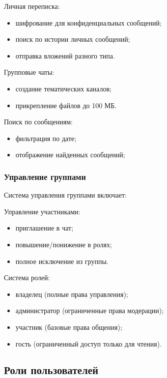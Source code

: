 Личная переписка:

	\begin{itemize}
		\item шифрование для конфиденциальных сообщений;
		\item поиск по истории личных сообщений;
		\item отправка вложений разного типа.
	\end{itemize}
	
Групповые чаты:

	\begin{itemize}
		\item создание тематических каналов;
		\item прикрепление файлов до 100 МБ.
	\end{itemize}
	
Поиск по сообщениям:

	\begin{itemize}
		\item фильтрация по дате;
		\item отображение найденных сообщений;
	\end{itemize}
	
\subsubsection{Управление группами}

Система управления группами включает:
	
Управление участниками:

	\begin{itemize}
		\item приглашение в чат;
		\item повышение/понижение в ролях;
		\item полное исключение из группы.
	\end{itemize}
	
Система ролей:

	\begin{itemize}
		\item владелец (полные права управления);
		\item администратор (ограниченные права модерации);
		\item участник (базовые права общения);
		\item гость (ограниченный доступ только для чтения).
	\end{itemize}
	

\subsection{Роли пользователей}

